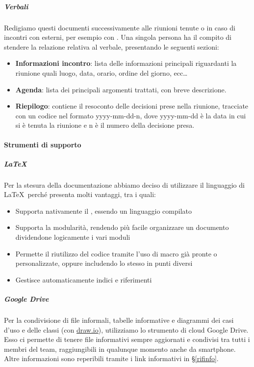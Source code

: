             \subparagraph{Verbali}
			Redigiamo questi documenti successivamente alle riunioni tenute	o in caso di incontri con  esterni, per esempio con \II. Una singola persona ha il compito di stendere
			la relazione relativa al verbale, presentando le seguenti sezioni:
			\begin{itemize}
				\item \textbf{Informazioni incontro}: lista delle informazioni principali riguardanti la riunione quali luogo, data, orario, ordine del giorno, ecc\dots
				\item \textbf{Agenda}: lista dei principali argomenti trattati, con breve descrizione.
				\item \textbf{Riepilogo}: contiene il resoconto delle decisioni prese nella riunione, tracciate con un codice nel formato yyyy-mm-dd-n, dove yyyy-mm-dd è la data in cui si è tenuta la riunione e n è il numero della decisione presa.
				
			\end{itemize}


			\paragraph{Strumenti di supporto}\label{StrumentiDiSupporto}

			\subparagraph{\LaTeX}\label{LaTeX}
			Per la stesura della documentazione abbiamo deciso di utilizzare il linguaggio di  \LaTeX\ perché presenta molti vantaggi, tra i quali:
			\begin{itemize}
				\item Supporta nativamente il , essendo un linguaggio compilato
				\item Supporta la modularità, rendendo più facile organizzare un documento dividendone logicamente i vari moduli
				\item Permette il riutilizzo del codice tramite l'uso di macro già pronte o personalizzate, oppure includendo lo stesso  in punti diversi
				\item Gestisce automaticamente indici e riferimenti
			\end{itemize}

			\subparagraph{Google Drive}\label{GoogleDrive}
			Per la condivisione di file informali, tabelle informative e diagrammi dei casi d'uso e delle classi (con \hyperref[drawio]{draw.io}), utilizziamo lo strumento
			di cloud Google Drive. Esso ci permette di tenere file informativi sempre aggiornati e condivisi tra tutti i membri del team, raggiungibili in qualunque momento
			anche da smartphone. Altre informazioni sono reperibili tramite i link informativi in \S\ref{rifinfo}.

